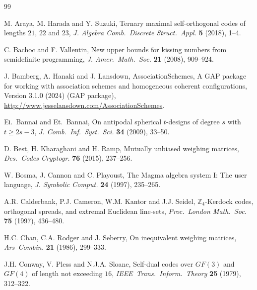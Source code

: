 \documentclass[12pt]{article}
\theoremstyle{remark}
\begin{document}
\begin{thebibliography}{99}

M. Araya, M. Harada and Y. Suzuki, 
Ternary maximal self-orthogonal codes of lengths $21$, $22$ and $23$,
\textsl{J. Algebra Comb.\ Discrete Struct.\ Appl.}
\textbf{5} (2018), 1--4.

C. Bachoc and F. Vallentin, 
New upper bounds for kissing numbers from semidefinite programming,
\textsl{J. Amer.\ Math.\ Soc.} 
\textbf{21} (2008), 909--924.

J. Bamberg, A. Hanaki and  J. Lansdown, 
AssociationSchemes, A GAP package for working with association schemes and homogeneous coherent configurations, 
Version 3.1.0 (2024)
(GAP package), \url{http://www.jesselansdown.com/AssociationSchemes}.


Ei.\ Bannai and Et.\ Bannai, 
On antipodal spherical $t$-designs of degree $s$ with $t\geq 2s-3$, 
\textsl{J. Comb.\ Inf.\ Syst.\ Sci.} 
\textbf{34} (2009), 33--50.




D. Best, H. Kharaghani and H. Ramp, 
Mutually unbiased weighing matrices,
\textsl{Des.\ Codes Cryptogr.} 
\textbf{76} (2015), 237--256.


W. Bosma, J. Cannon and C. Playoust,
The Magma algebra system I: The user language,
\textsl{J. Symbolic Comput.}
\textbf{24} (1997), 235--265.

A.R. Calderbank, P.J. Cameron, W.M. Kantor and J.J. Seidel, 
$\mathbb{Z}_4$-Kerdock codes, orthogonal spreads, and extremal Euclidean line-sets,
\textsl{Proc.\ London Math.\ Soc.} 
\textbf{75} (1997), 436--480.

 H.C. Chan, C.A. Rodger and J. Seberry,
On inequivalent weighing matrices,
\textsl{Ars\ Combin.}
\textbf{21} (1986), 299--333.

J.H. Conway, V. Pless and N.J.A. Sloane,
Self-dual codes over $GF(3)$ and $GF(4)$ of length not exceeding $16$,
\textsl{IEEE\ Trans.\ Inform.\ Theory} 
\textbf{25} (1979), 312--322.


\end{thebibliography}
\end{document}
